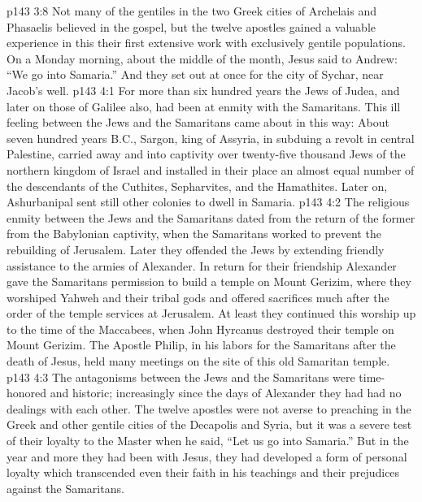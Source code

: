 \pc \vs p143 3:8 Not many of the gentiles in the two Greek cities of Archelais and Phasaelis believed in the gospel, but the twelve apostles gained a valuable experience in this their first extensive work with exclusively gentile populations. On a Monday morning, about the middle of the month, Jesus said to Andrew: \textcolor{ubdarkred}{“We go into Samaria.”} And they set out at once for the city of Sychar, near Jacob’s well.
%
\vs p143 4:1 For more than six hundred years the Jews of Judea, and later on those of Galilee also, had been at enmity with the Samaritans. This ill feeling between the Jews and the Samaritans came about in this way: About seven hundred years B.C., Sargon, king of Assyria, in subduing a revolt in central Palestine, carried away and into captivity over twenty\hyp{}five thousand Jews of the northern kingdom of Israel and installed in their place an almost equal number of the descendants of the Cuthites, Sepharvites, and the Hamathites. Later on, Ashurbanipal sent still other colonies to dwell in Samaria.
\vs p143 4:2 The religious enmity between the Jews and the Samaritans dated from the return of the former from the Babylonian captivity, when the Samaritans worked to prevent the rebuilding of Jerusalem. Later they offended the Jews by extending friendly assistance to the armies of Alexander. In return for their friendship Alexander gave the Samaritans permission to build a temple on Mount Gerizim, where they worshiped Yahweh and their tribal gods and offered sacrifices much after the order of the temple services at Jerusalem. At least they continued this worship up to the time of the Maccabees, when John Hyrcanus destroyed their temple on Mount Gerizim. The Apostle Philip, in his labors for the Samaritans after the death of Jesus, held many meetings on the site of this old Samaritan temple.
\vs p143 4:3 The antagonisms between the Jews and the Samaritans were time\hyp{}honored and historic; increasingly since the days of Alexander they had had no dealings with each other. The twelve apostles were not averse to preaching in the Greek and other gentile cities of the Decapolis and Syria, but it was a severe test of their loyalty to the Master when he said, \textcolor{ubdarkred}{“Let us go into Samaria.”} But in the year and more they had been with Jesus, they had developed a form of personal loyalty which transcended even their faith in his teachings and their prejudices against the Samaritans.
